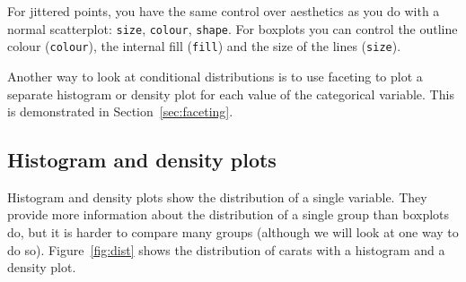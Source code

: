 % 


% 
For jittered points, you have the same control over aesthetics as you do with a normal scatterplot: {\tt size}, {\tt colour}, {\tt shape}.  For boxplots you can control the outline colour ({\tt colour}), the internal fill ({\tt fill}) and the size of the lines ({\tt size}).  

Another way to look at conditional distributions is to use faceting to plot a separate histogram or density plot for each value of the categorical variable.  This is demonstrated in Section~\ref{sec:faceting}.

\subsection{Histogram and density plots}\label{sub:density}

Histogram and density plots show the distribution of a single variable.  They provide more information about the distribution of a single group than boxplots do, but it is harder to compare many groups (although we will look at one way to do so).  Figure~\ref{fig:dist} shows the distribution of carats with a histogram and a density plot.

% 


